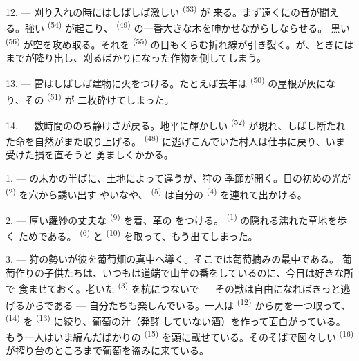 \VUsaut{5.0mm}
\VUsaut{3.4mm}

12. --- 刈り入れの時にはしばしば激しい \textsuperscript{(53)} が
来る。まず遠くにの音が聞える。強い \textsuperscript{(54)}
が起こり、 \textsuperscript{(49)} の一番大きな木を呻かせながらしならせる。
黒い \textsuperscript{(56)} が空を攻め取る。それを
\textsuperscript{(55)} の目もくらむ折れ線が引き裂く。が、ときには
までが降り出し、刈るばかりになった作物を倒してしまう。

13. --- 雷はしばしば建物に火をつける。たとえば去年は
\textsuperscript{(50)} の屋根が灰になり、その \textsuperscript{(51)} が
二枚砕けてしまった。

14. --- 数時間ののち静けさが戻る。地平に輝かしい \textsuperscript{(52)}
が現れ、しばし断たれた命を自然がまた取り上げる。
\textsuperscript{(48)} に逃げこんでいた村人は仕事に戻り、いま受けた損を直そうと
勇ましくかかる。

\VUsaut{6.0mm}
\VUsaut{3.6mm}

\VUsaut{1.4mm}
\VUsaut{4.0mm}

1. --- の末かの半ばに、土地によって違うが、狩の
季節が開く。日の初めの光が \textsuperscript{(2)} を穴から誘い出す
やいなや、 \textsuperscript{(5)} は自分の \textsuperscript{(4)}
を連れて出かける。

2. --- 厚い羅紗の丈夫な \textsuperscript{(9)} を着、革の
をつける。 \textsuperscript{(1)} の隠れる濡れた草地を歩く
ためである。 \textsuperscript{(6)} と \textsuperscript{(10)}
を取って、もう出てしまった。

3. --- 狩の勢いが彼を葡萄畑の真中へ導く。そこでは葡萄摘みの最中である。
葡萄作りの子供たちは、いつもは道端で山羊の番をしているのに、今日は好きな所で
食ませておく。老いた \textsuperscript{(3)} を杭につないで ---
その獣は自由になればきっと逃げるからである --- 自分たちも楽しんでいる。一人は
 \textsuperscript{(12)} から房を一つ取って、
\textsuperscript{(14)} を \textsuperscript{(13)} に絞り、葡萄の汁（発酵
していない酒）を作って面白がっている。もう一人はいま編んだばかりの
 \textsuperscript{(15)} を頭に載せている。そのそばで図々しい
 \textsuperscript{(16)} が搾り台のところまで葡萄を盗みに来ている。

